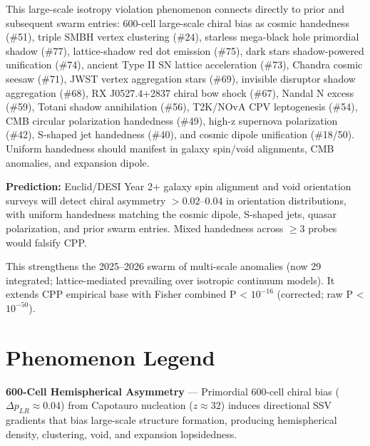 \documentclass[11pt]{article}
\begin{document}
This large-scale isotropy violation phenomenon connects directly to prior and subsequent swarm entries: 600-cell large-scale chiral bias as cosmic handedness (\#51), triple SMBH vertex clustering (\#24), starless mega-black hole primordial shadow (\#77), lattice-shadow red dot emission (\#75), dark stars shadow-powered unification (\#74), ancient Type II SN lattice acceleration (\#73), Chandra cosmic seesaw (\#71), JWST vertex aggregation stars (\#69), invisible disruptor shadow aggregation (\#68), RX J0527.4+2837 chiral bow shock (\#67), Nandal N excess (\#59), Totani shadow annihilation (\#56), T2K/NOvA CPV leptogenesis (\#54), CMB circular polarization handedness (\#49), high-z supernova polarization (\#42), S-shaped jet handedness (\#40), and cosmic dipole unification (\#18/50). Uniform handedness should manifest in galaxy spin/void alignments, CMB anomalies, and expansion dipole.

\textbf{Prediction:} Euclid/DESI Year 2+ galaxy spin alignment and void orientation surveys will detect chiral asymmetry $>0.02$--$0.04$ in orientation distributions, with uniform handedness matching the cosmic dipole, S-shaped jets, quasar polarization, and prior swarm entries. Mixed handedness across $\geq 3$ probes would falsify CPP.

This strengthens the 2025--2026 swarm of multi-scale anomalies (now 29 integrated; lattice-mediated prevailing over isotropic continuum models). It extends CPP empirical base with Fisher combined P < $10^{-16}$ (corrected; raw P < $10^{-50}$).

\section{Phenomenon Legend}
\textbf{600-Cell Hemispherical Asymmetry} — Primordial 600-cell chiral bias ($\Delta p_{LR} \approx 0.04$) from Capotauro nucleation ($z \approx 32$) induces directional SSV gradients that bias large-scale structure formation, producing hemispherical density, clustering, void, and expansion lopsidedness.
\end{document}

